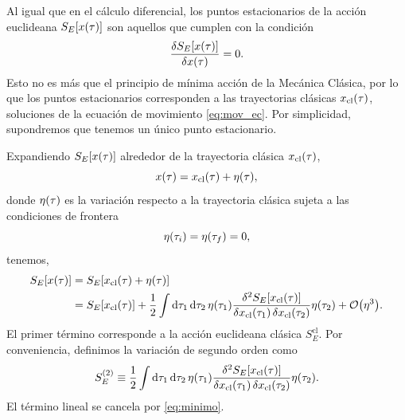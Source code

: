 Al igual que en el cálculo diferencial, los puntos estacionarios de la acción euclideana $S_E\qty[x\qty(\tau)]$ son aquellos que cumplen con la condición
\begin{equation}\label{eq:minimo}
	\fdv{S_E\qty[x\qty(\tau)]}{x\qty(\tau)} = 0.
\end{equation}
Esto no es más que el principio de mínima acción de la Mecánica Clásica, por lo que los puntos estacionarios corresponden a las trayectorias clásicas $x_{\text{cl}}\qty(\tau)$, soluciones de la ecuación de movimiento \eqref{eq:mov_ec}. Por simplicidad, supondremos que tenemos un único punto estacionario.

Expandiendo $S_E\qty[x\qty(\tau)]$ alrededor de la trayectoria clásica $x_{\text{cl}}\qty(\tau)$,
\begin{equation} \label{eq:trayec}
	x\qty(\tau) = x_{\textrm{cl}}\qty(\tau) + \eta\qty(\tau),
\end{equation}
donde $\eta\qty(\tau)$ es la variación respecto a la trayectoria clásica sujeta a las condiciones de frontera
\begin{equation}
	\eta\qty(\tau_i) = \eta\qty(\tau_f) = 0,
\end{equation}
tenemos,
\begin{align} 
S_{E}\qty[x\qty(\tau)] &= S_{E}[x_{\textrm{cl}}(\tau) +  \eta\qty(\tau)] \\ 
&= S_{E}[x_{\textrm{cl}}\qty(\tau)]
+ \frac{1}{2} \int \dd{\tau_1} \dd{\tau_2} \eta(\tau_1) \frac{\delta^2 S_E[x_{\textrm{cl}}\qty(\tau)]}{\var{x_{\textrm{cl}}\qty(\tau_1)} \var{x_{\textrm{cl}}\qty(\tau_2)}} \eta\qty(\tau_2) + \order{\eta^3}. \label{eq:approx1}
\end{align}
El primer término corresponde a la acción euclideana clásica  $S_E^{\textrm{cl}}$. Por conveniencia, definimos la variación de segundo orden como
\begin{equation}
	S_E^{(2)} \equiv \frac{1}{2} \int \dd{\tau_1} \dd{\tau_2} \eta\qty(\tau_1) \frac{\delta^2 S_E[x_{\textrm{cl}}\qty(\tau)]}{\var{x_{\textrm{cl}}(\tau_1)} \var{x_{\textrm{cl}}\qty(\tau_2)}} \eta\qty(\tau_2). \label{eq:S_2}
\end{equation}
El término lineal se cancela  por \eqref{eq:minimo}.%

